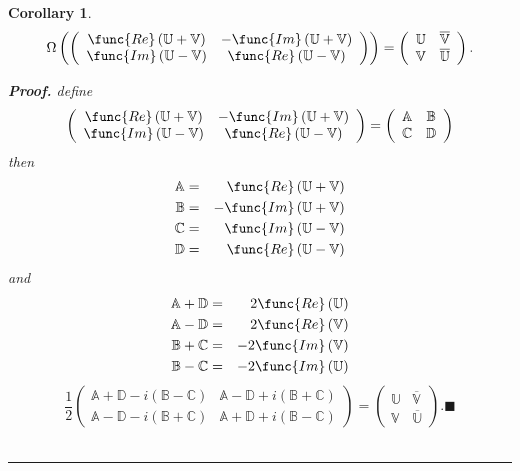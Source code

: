 \documentclass[aps,preprint]{revtex4}
\newtheorem{corollary}[theorem]{Corollary}
\newenvironment{proof}[1][Proof]{\noindent\textbf{#1.} }{\ \rule{0.5em}{0.5em}}
\begin{document}
\begin{corollary}
\begin{equation}
\Omega \left( \left( 
\begin{array}{cc}
\func{Re}\left( \mathbb{U+V}\right) & -\func{Im}\left( \mathbb{U+V}\right)
\\ 
\func{Im}\left( \mathbb{U-V}\right) & \func{Re}\left( \mathbb{U-V}\right)%
\end{array}%
\right) \right) =\left( 
\begin{array}{cc}
\mathbb{U} & \overline{\mathbb{V}} \\ 
\mathbb{V} & \overline{\mathbb{U}}%
\end{array}%
\right) .
\end{equation}

\begin{proof}
define 
\begin{equation}
\left( 
\begin{array}{cc}
\func{Re}\left( \mathbb{U+V}\right) & -\func{Im}\left( \mathbb{U+V}\right)
\\ 
\func{Im}\left( \mathbb{U-V}\right) & \func{Re}\left( \mathbb{U-V}\right)%
\end{array}%
\right) =\left( 
\begin{array}{cc}
\mathbb{A} & \mathbb{B} \\ 
\mathbb{C} & \mathbb{D}%
\end{array}%
\right)
\end{equation}%
then%
\begin{eqnarray}
\mathbb{A} &=&\func{Re}\left( \mathbb{U+V}\right) \\
\mathbb{B} &=&-\func{Im}\left( \mathbb{U+V}\right) \\
\mathbb{C} &=&\func{Im}\left( \mathbb{U-V}\right) \\
\mathbb{D} &=&\func{Re}\left( \mathbb{U-V}\right)
\end{eqnarray}%
and 
\begin{eqnarray}
\mathbb{A+D} &=&2\func{Re}\left( \mathbb{U}\right) \\
\mathbb{A-D} &=&2\func{Re}\left( \mathbb{V}\right) \\
\mathbb{B+C} &=&-2\func{Im}\left( \mathbb{V}\right) \\
\mathbb{B-C} &=&-2\func{Im}\left( \mathbb{U}\right)
\end{eqnarray}%
\begin{equation}
\frac{1}{2}\left( 
\begin{array}{cc}
\mathbb{A+D}-i\left( \mathbb{B-C}\right) & \mathbb{A-D}+i\left( \mathbb{B+C}%
\right) \\ 
\mathbb{A-D}-i\left( \mathbb{B+C}\right) & \mathbb{A+D}+i\left( \mathbb{B-C}%
\right)%
\end{array}%
\right) =\left( 
\begin{array}{cc}
\mathbb{U} & \overline{\mathbb{V}} \\ 
\mathbb{V} & \overline{\mathbb{U}}%
\end{array}%
\right) .\blacksquare
\end{equation}
\end{proof}
\end{corollary}
\end{document}
